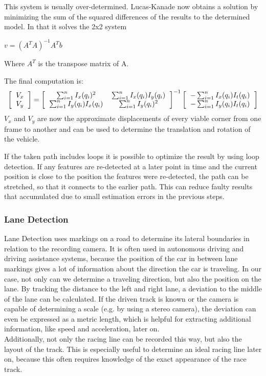 This system is usually over-determined. Lucas-Kanade now obtains a solution by minimizing the sum of the squared differences of the results to the determined model.
In that it solves the 2x2 system

	$v = (A^T A)^{-1} A^T b$

Where $A^T$ is the transpose matrix of A.

The final computation is:
\[
\left[
\begin{tabular}{c}
	$V_x$ \\
	$V_y$
\end{tabular}
\right]
= 
\left[
\begin{tabular}{cc}
	$\sum_{i = 1}^n I_x(q_i)^2$ & $\sum_{i = 1}^n I_x(q_i) I_y(q_i)$ \\
	$\sum_{i = 1}^n I_y(q_i) I_x(q_i)$ & $\sum_{i = 1}^n I_y(q_i)^2$
\end{tabular}
\right]
^{-1}
\left[
\begin{tabular}{c}
	$- \sum_{i = 1}^n I_x(q_i) I_t(q_i)$ \\
	$- \sum_{i = 1}^n I_y(q_i) I_t(q_i)$ 
\end{tabular}
\right]
\]
$V_x$ and $V_y$ are now the approximate displacements of every viable corner from one frame to another and can be used to determine the translation and rotation of the vehicle.

If the taken path includes loops it is possible to optimize the result by using loop detection. If any features are re-detected at a later point in time and the current position is close to the position the features were re-detected, the path can be stretched, so that it connects to the earlier path.
This can reduce faulty results that accumulated due to small estimation errors in the previous steps.

\subsubsection{Lane Detection}
Lane Detection uses markings on a road to determine its lateral boundaries in relation to the recording camera. It is often used in autonomous driving and driving assistance systems, because the position of the car in between lane markings gives a lot of information about the direction the car is traveling. 
In our case, not only can we determine a traveling direction, but also the position on the lane.
By tracking the distance to the left and right lane, a deviation to the middle of the lane can be calculated. 
If the driven track is known or the camera is capable of determining a scale (e.g. by using a stereo camera), the deviation can even be expressed as a metric length, which is helpful for extracting additional information, like speed and acceleration, later on.\\
Additionally, not only the racing line can be recorded this way, but also the layout of the track. This is especially useful to determine an ideal racing line later on, because this often requires knowledge of the exact appearance of the race track.

